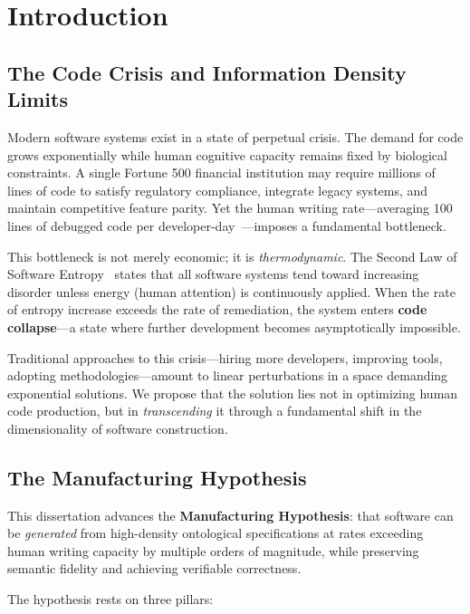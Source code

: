\chapter{Introduction}
\label{ch:introduction}

\section{The Code Crisis and Information Density Limits}

Modern software systems exist in a state of perpetual crisis. The demand for code grows exponentially while human cognitive capacity remains fixed by biological constraints. A single Fortune 500 financial institution may require millions of lines of code to satisfy regulatory compliance, integrate legacy systems, and maintain competitive feature parity. Yet the human writing rate---averaging 100 lines of debugged code per developer-day~\cite{mcconnell2004code}---imposes a fundamental bottleneck.

This bottleneck is not merely economic; it is \textit{thermodynamic}. The Second Law of Software Entropy~\cite{lehman1980programs} states that all software systems tend toward increasing disorder unless energy (human attention) is continuously applied. When the rate of entropy increase exceeds the rate of remediation, the system enters \textbf{code collapse}---a state where further development becomes asymptotically impossible.

Traditional approaches to this crisis---hiring more developers, improving tools, adopting methodologies---amount to linear perturbations in a space demanding exponential solutions. We propose that the solution lies not in optimizing human code production, but in \textit{transcending} it through a fundamental shift in the dimensionality of software construction.

\section{The Manufacturing Hypothesis}

This dissertation advances the \textbf{Manufacturing Hypothesis}: that software can be \textit{generated} from high-density ontological specifications at rates exceeding human writing capacity by multiple orders of magnitude, while preserving semantic fidelity and achieving verifiable correctness.

The hypothesis rests on three pillars:

